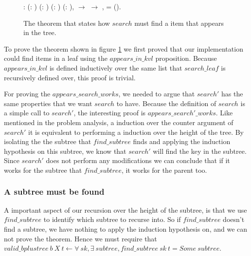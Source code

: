 \begin{figure}
  \begin{coqdoccode}
  \coqdocnoindent
    : \coqdockw{\ensuremath{\forall}} (: ) (: ) (:   ) (: ),\coqdoceol
  \coqdocindent{1.00em}
      \ensuremath{\rightarrow} \coqdoceol
  \coqdocindent{1.00em}
     \ensuremath{\rightarrow} \coqdoceol
  \coqdocindent{1.00em}
  \coqdocvar{\ensuremath{\exists}} ,    = ().\coqdoceol
  \end{coqdoccode}
  \caption{The theorem that states how $search$ must find a item that appears in the tree.}
  \label{fig:search_works}
\end{figure}

To prove the theorem shown in figure \ref{fig:search_works} we first proved that our implementation could find items in a leaf using the $appears\_in\_kvl$ proposition. Because $appears\_in\_kvl$ is defined inductively over the same list that $search\_leaf$ is recursively defined over, this proof is trivial.

For proving the $appears\_search\_works$, we needed to argue that $search'$ has the same properties that we want $search$ to have. Because the definition of $search$ is a simple call to $search'$, the interesting proof is $appears\_search'\_works$. Like mentioned in the problem analysis, a induction over the counter argument of $search'$ it is equivalent to performing a induction over the height of the tree. By isolating the the subtree that $find\_subtree$ finds and applying the induction hypothesis on this subtree, we know that $search'$ will find the key in the subtree. Since $search'$ does not perform any modifications we can conclude that if it works for the subtree that $find\_subtree$, it works for the parent too. 

\subsubsection{A subtree must be found}

A important aspect of our recursion over the height of the subtree, is that we use $find\_subtree$ to identify which subtree to recurse into. So if $find\_subtree$ doesn't find a subtree, we have nothing to apply the induction hypothesis on, and we can not prove the theorem. Hence we must require that
$valid\_bplustree~b~X~t \leftarrow \forall~sk, \exists~subtree, find\_subtree~ sk~t = Some~subtree$.

